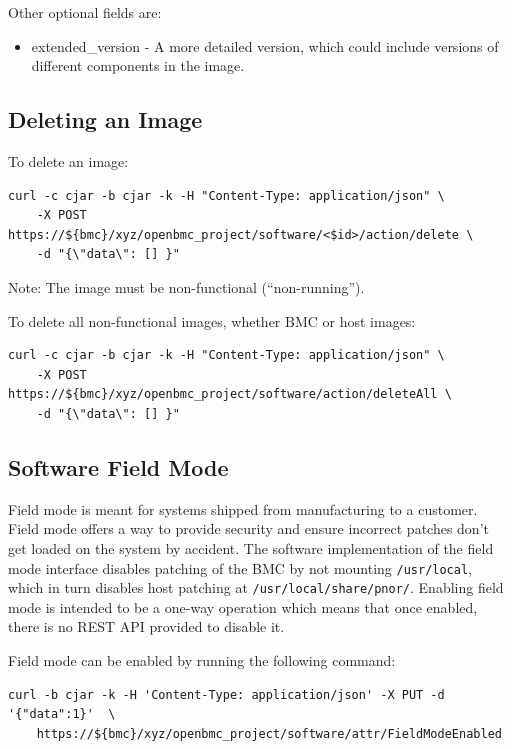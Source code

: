 Other optional fields are:

\begin{itemize}
\tightlist
\item
  extended\_version - A more detailed version, which could include
  versions of different components in the image.
\end{itemize}

\hypertarget{deleting-an-image}{%
\subsection{Deleting an Image}\label{deleting-an-image}}

To delete an image:

\begin{verbatim}
curl -c cjar -b cjar -k -H "Content-Type: application/json" \
    -X POST https://${bmc}/xyz/openbmc_project/software/<$id>/action/delete \
    -d "{\"data\": [] }"
\end{verbatim}

Note: The image must be non-functional (``non-running'').

To delete all non-functional images, whether BMC or host images:

\begin{verbatim}
curl -c cjar -b cjar -k -H "Content-Type: application/json" \
    -X POST https://${bmc}/xyz/openbmc_project/software/action/deleteAll \
    -d "{\"data\": [] }"
\end{verbatim}

\hypertarget{software-field-mode}{%
\subsection{Software Field Mode}\label{software-field-mode}}

Field mode is meant for systems shipped from manufacturing to a
customer. Field mode offers a way to provide security and ensure
incorrect patches don't get loaded on the system by accident. The
software implementation of the field mode interface disables patching of
the BMC by not mounting \texttt{/usr/local}, which in turn disables host
patching at \texttt{/usr/local/share/pnor/}. Enabling field mode is
intended to be a one-way operation which means that once enabled, there
is no REST API provided to disable it.

Field mode can be enabled by running the following command:

\begin{verbatim}
curl -b cjar -k -H 'Content-Type: application/json' -X PUT -d '{"data":1}'  \
    https://${bmc}/xyz/openbmc_project/software/attr/FieldModeEnabled
\end{verbatim}

